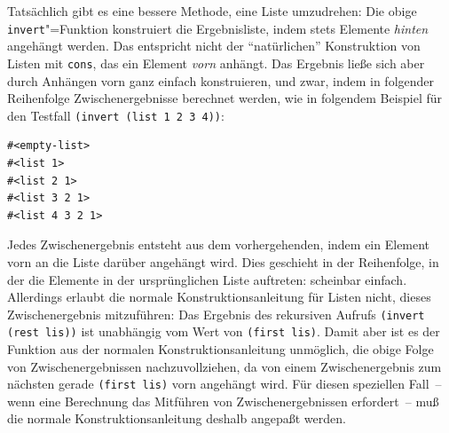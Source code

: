 Tatsächlich gibt es eine bessere Methode, eine Liste umzudrehen: Die
obige \texttt{invert}"=Funktion konstruiert die Ergebnisliste, indem
stets Elemente \emph{hinten} angehängt werden.  Das entspricht 
nicht der "`natürlichen"' Konstruktion von Listen mit
\texttt{cons}, das ein Element \emph{vorn} anhängt.  
Das Ergebnis ließe sich aber durch Anhängen vorn ganz einfach
konstruieren, und zwar, indem in folgender Reihenfolge
Zwischenergebnisse berechnet werden, wie in folgendem Beispiel für den
Testfall \texttt{(invert (list 1 2 3 4))}:
%
\begin{verbatim}
#<empty-list>
#<list 1>
#<list 2 1>
#<list 3 2 1>
#<list 4 3 2 1>
\end{verbatim}
%
Jedes Zwischenergebnis entsteht aus dem vorhergehenden, indem ein
Element vorn an die Liste darüber angehängt wird.  Dies geschieht in
der Reihenfolge, in der die Elemente in der ursprünglichen Liste
auftreten: scheinbar einfach.  Allerdings erlaubt die normale
Konstruktionsanleitung für Listen nicht, dieses Zwischenergebnis
mitzuführen: Das Ergebnis des rekursiven Aufrufs \texttt{(invert (rest
  lis))} ist unabhängig vom Wert von \texttt{(first lis)}.  Damit aber
ist es der Funktion aus der normalen Konstruktionsanleitung unmöglich,
die obige Folge von Zwischenergebnissen nachzuvollziehen, da von einem
Zwischenergebnis zum nächsten gerade \texttt{(first lis)} vorn
angehängt wird.  Für diesen speziellen Fall~-- wenn eine Berechnung das
Mitführen von Zwischenergebnissen erfordert~-- muß die normale
Konstruktionsanleitung deshalb angepaßt werden.

